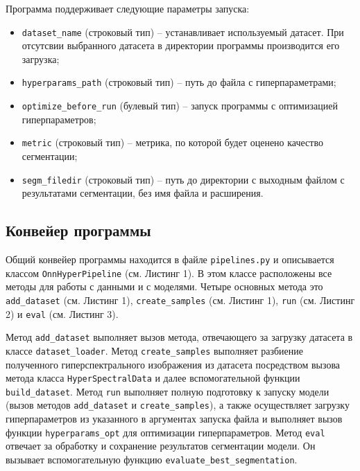 \documentclass[14pt, russian]{scrartcl}
\begin{document}
Программа поддерживает следующие параметры запуска:

\begin{itemize}
    \item \texttt{dataset\_name} (строковый тип) -- устанавливает используемый датасет. При отсутсвии выбранного датасета в директории программы производится его загрузка;
    \item \texttt{hyperparams\_path} (строковый тип) -- путь до файла с гиперпараметрами;
    \item \texttt{optimize\_before\_run} (булевый тип) -- запуск программы с оптимизацией гиперпараметров;
    \item \texttt{metric} (строковый тип) -- метрика, по которой будет оценено качество сегментации;
    \item \texttt{segm\_filedir} (строковый тип) -- путь до директории с выходным файлом с результатами сегментации, без имя файла и расширения.
\end{itemize}

\subsection{Конвейер программы}

Общий конвейер программы находится в файле \texttt{pipelines.py} и описывается классом \texttt{OnnHyperPipeline} (см. Листинг 1). В этом классе расположены все методы для работы с данными и 
с моделями. Четыре основных метода это \texttt{add\_dataset} (см. Листинг 1), \texttt{create\_samples} (см. Листинг 1), \texttt{run} (см. Листинг 2) и \texttt{eval} (см. Листинг 3).

Метод \texttt{add\_dataset} выполняет вызов метода, отвечающего за загрузку датасета в классе \texttt{dataset\_loader}. Метод \texttt{create\_samples} выполняет разбиение полученного 
гиперспектрального изображения из датасета посредством вызова метода класса \texttt{HyperSpectralData} и далее вспомогательной функции \texttt{build\_dataset}. 
Метод \texttt{run} выполняет полную подготовку к запуску модели (вызов методов \texttt{add\_dataset} и \texttt{create\_samples}), а также осуществляет загрузку гиперпараметров из указанного 
в аргументах запуска файла и выполняет вызов функции \texttt{hyperparams\_opt} для оптимизации гиперпараметров.
Метод \texttt{eval} отвечает за обработку и сохранение результатов сегментации модели. Он вызывает вспомогательную функцию \texttt{evaluate\_best\_segmentation}.
\end{document}
